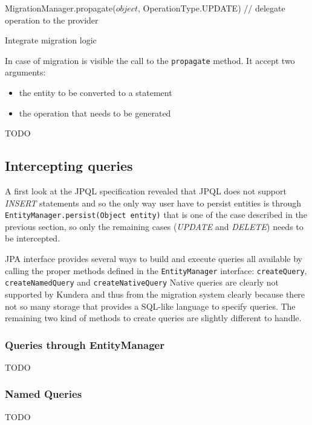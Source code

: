 \begin{algorithm}[h]
  \begin{algorithmic}[1]
        \State MigrationManager.propagate($object$, OperationType.UPDATE)
      \Else
        \State // delegate operation to the provider
      \EndIf
    \EndProcedure
  \end{algorithmic}	
  \caption{Integrate migration logic}
  \label{code:isMigrating}
\end{algorithm}

\noindent In case of migration is visible the call to the \texttt{propagate} method. It accept two arguments:
\begin{itemize}
\item the entity to be converted to a statement
\item the operation that needs to be generated
\end{itemize}
TODO

\subsection{Intercepting queries}
A first look at the JPQL specification \cite{book:projpa2} revealed that JPQL does not support \textit{INSERT} statements and so the only way user have to persist entities is through \texttt{EntityManager.persist(Object entity)} that is one of the case described in the previous section, so only the remaining cases (\textit{UPDATE} and \textit{DELETE}) needs to be intercepted.

\noindent JPA interface provides several ways to build and execute queries all available by calling the proper methods defined in the \texttt{EntityManager} interface: \texttt{createQuery}, \texttt{createNamedQuery} and \texttt{createNativeQuery}
Native queries are clearly not supported by Kundera and thus from the migration system clearly because there not so many storage that provides a SQL-like language to specify queries.
The remaining two kind of methods to create queries are slightly different to handle.

\subsubsection{Queries through EntityManager}
TODO

\subsubsection{Named Queries}
TODO

